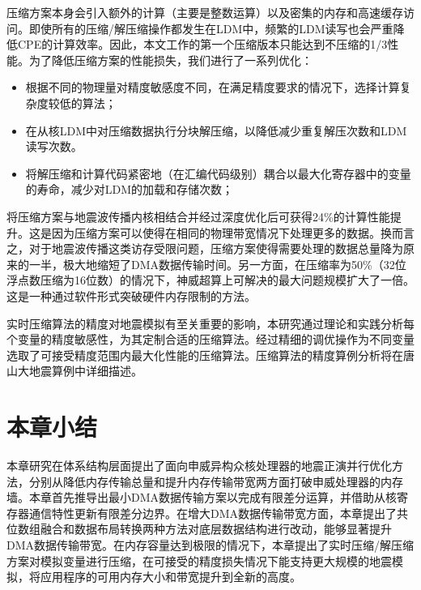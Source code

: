 压缩方案本身会引入额外的计算（主要是整数运算）以及密集的内存和高速缓存访问。即使所有的压缩/解压缩操作都发生在LDM中，频繁的LDM读写也会严重降低CPE的计算效率。因此，本文工作的第一个压缩版本只能达到不压缩的1/3性能。为了降低压缩方案的性能损失，我们进行了一系列优化：

\begin{itemize}
  \item 根据不同的物理量对精度敏感度不同，在满足精度要求的情况下，选择计算复杂度较低的算法；
  \item 在从核LDM中对压缩数据执行分块解压缩，以降低减少重复解压次数和LDM读写次数。
  \item 将解压缩和计算代码紧密地（在汇编代码级别）耦合以最大化寄存器中的变量的寿命，减少对LDM的加载和存储次数；
\end{itemize}

将压缩方案与地震波传播内核相结合并经过深度优化后可获得24\%的计算性能提升。这是因为压缩方案可以使得在相同的物理带宽情况下处理更多的数据。换而言之，对于地震波传播这类访存受限问题，压缩方案使得需要处理的数据总量降为原来的一半，极大地缩短了DMA数据传输时间。另一方面，在压缩率为50\%（32位浮点数压缩为16位数）的情况下，神威超算上可解决的最大问题规模扩大了一倍。这是一种通过软件形式突破硬件内存限制的方法。

实时压缩算法的精度对地震模拟有至关重要的影响，本研究通过理论和实践分析每个变量的精度敏感性，为其定制合适的压缩算法。经过精细的调优操作为不同变量选取了可接受精度范围内最大化性能的压缩算法。压缩算法的精度算例分析将在唐山大地震算例中详细描述。

\section{本章小结}

本章研究在体系结构层面提出了面向申威异构众核处理器的地震正演并行优化方法，分别从降低内存传输总量和提升内存传输带宽两方面打破申威处理器的内存墙。本章首先推导出最小DMA数据传输方案以完成有限差分运算，并借助从核寄存器通信特性更新有限差分边界。在增大DMA数据传输带宽方面，本章提出了共位数组融合和数据布局转换两种方法对底层数据结构进行改动，能够显著提升DMA数据传输带宽。在内存容量达到极限的情况下，本章提出了实时压缩/解压缩方案对模拟变量进行压缩，在可接受的精度损失情况下能支持更大规模的地震模拟，将应用程序的可用内存大小和带宽提升到全新的高度。


